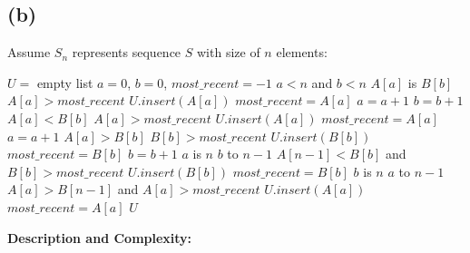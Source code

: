     \subsection{(b)}
    \vspace{-2mm}
    \begin{spacing}{1.2}
        Assume $S_n$ represents sequence $S$ with size of $n$ elements:
        \begin{codebox}
            \li $U =$ empty list
            \li $a = 0$, $b = 0$, $most\_recent = -1$
            \li \While $a < n$ and $b<n$
                \Do
                    \li \If $A[a]$ is $B[b]$
                    \Then
                        \li \If $A[a] > most\_recent$
                        \Then
                            \li $U.insert(A[a])$
                            \li $most\_recent = A[a]$
                        \End
                        \li $a = a + 1$
                        \li $b = b + 1$
                    \li \ElseIf $A[a] < B[b]$
                    \Then
                        \li \If $A[a] > most\_recent$
                        \Then
                            \li $U.insert(A[a])$
                            \li $most\_recent = A[a]$
                        \End
                        \li $a = a + 1$
                    \li \ElseIf $A[a] > B[b]$
                    \Then
                    \li \If $B[b] > most\_recent$
                        \Then
                            \li $U.insert(B[b])$
                            \li $most\_recent = B[b]$
                        \End
                        \li $b = b + 1$
                    \End 
                \End
            \li \If $a$ is $n$
            \Then
                \li \For $b$ to $n-1$
                \Then
                    \li \If $A[n-1]<B[b]$ and $B[b]>most\_recent$
                    \Then
                        \li $U.insert(B[b])$
                        \li $most\_recent = B[b]$
                    \End
                \End
            \li \ElseIf $b$ is $n$
            \Then
                \li \For $a$ to $n-1$
                \Then
                    \li \If $A[a]>B[n-1]$ and $A[a]>most\_recent$
                    \Then
                        \li $U.insert(A[a])$
                        \li $most\_recent = A[a]$
                    \End
                \End
            \End
            \li \Return $U$
        \end{codebox}
    \end{spacing}
    \textbf{Description and Complexity:}
    
